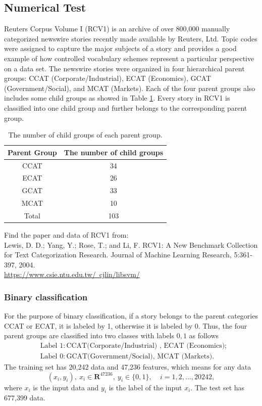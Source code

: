 
\subsection{Numerical Test}
Reuters Corpus Volume I (RCV1) is an archive of over 800,000 manually categorized newswire stories recently made available by Reuters, Ltd. Topic codes were assigned to capture the major subjects of a story and  provides a good example of how controlled vocabulary schemes represent a particular perspective on a data set. The newswire stories were organized in four hierarchical parent groups: CCAT (Corporate/Industrial), ECAT (Economics), GCAT (Government/Social), and MCAT (Markets). Each of the four parent groups also includes some child groups as showed in Table \ref{RCV1}. Every story in RCV1 is classified into one child group and further belongs to the corresponding parent group. 
\begin{table}[H]\label{RCV1}
	\centering
	\begin{tabular}{|c|c|}
		\hline
		Parent Group&  The number of child groups \\
		\hline
		CCAT&   34 \\
		ECAT&   26 \\
		GCAT&   33 \\
		MCAT&   10 \\
		\hline   
		Total&  103\\
		\hline
	\end{tabular}
	\caption{The number of child groups of each parent group.}
\end{table}
\noindent Find the paper and data of RCV1 from:\\
Lewis, D. D.; Yang, Y.; Rose, T.; and Li, F. RCV1: A New Benchmark Collection for Text Categorization Research. Journal of Machine Learning Research, 5:361-397, 2004.\\ \href{https://www.csie.ntu.edu.tw/~cjlin/libsvm/}{https://www.csie.ntu.edu.tw/~cjlin/libsvm/}
\subsubsection{Binary classification}
For the purpose of binary classification, if a story belongs to the parent categories CCAT or ECAT, it is labeled by 1, otherwise it is labeled by 0. Thus, the four parent groups are classified into two classes with labels $0,1$ as follows
\begin{equation*}
	\begin{aligned}
		&\text{Label 1}: \text{CCAT(Corporate/Industrial) , ECAT (Economics)};\\ 
		&\text{Label 0}: \text{GCAT(Government/Social), MCAT (Markets)}.
	\end{aligned}
\end{equation*}
The training set has 20,242 data and 47,236 features, which means
for any data 
$$(x_i,y_i),~x_i\in \mathbf{R}^{47236},~y_i\in\{0,1\},~~~~~i=1,2,...,20242,$$
where $x_i$ is the input data and $y_i$ is the label of the input $x_i$. The test set has 677,399 data.


